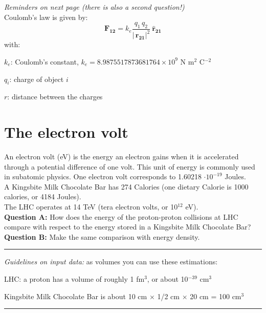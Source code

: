 \documentclass[12pt]{article}
\begin{document}
\textit{Reminders on next page (there is also a second question!)}\\
\newpage
Coulomb's law is given by:
\begin{equation}
 \mathbf{F_{12}} = k_e \frac{q_1 \, q_2}{| \, \mathbf{r_{21}}|^2} \: \mathbf{\hat{r}_{21}} 
\end{equation}
with:
    \begin{description}
        \item $k_e$: Coulomb's constant, $k_e = 8.9875517873681764 \times 10^9$ N m$^2$ C$^{-2}$
        \item $q_i$: charge of object $i$
        \item $r$: distance between the charges
    \end{description}

\section{The electron volt}
An electron volt (eV) is the energy an electron gains when it is accelerated through a potential difference of one volt. 
This unit of energy is commonly used in subatomic physics. One electron volt corresponds to 1.60218  $ \cdot 10^{-19}$ Joules. \\

A Kingsbite Milk Chocolate Bar has 274 Calories (one dietary Calorie is 1000 calories, or 4184 Joules).\\

The LHC operates at 14 TeV (tera electron volts, or 10$^{12}$ eV).\\


\textbf{Question A:} How does the energy of the proton-proton collisions at LHC compare with respect to the energy stored in a Kingsbite Milk Chocolate Bar?\\ 

\textbf{Question B:} Make the same comparison with energy density.\\

\vspace{4ex}
\hrule
\vspace{4ex}
\textit{Guidelines on input data:} as volumes you can use these estimations:
    \begin{description}
        \item LHC: a proton has a volume of roughly 1 fm$^3$, or about 10$^{-39}$ cm$^3$
        \item Kingsbite Milk Chocolate Bar is about 10 cm $\times$ 1/2 cm $\times$ 20 cm = 100 cm$^3$
    \end{description}

\vspace{4ex}
\hrule
\vspace{4ex}
    
\end{document}
